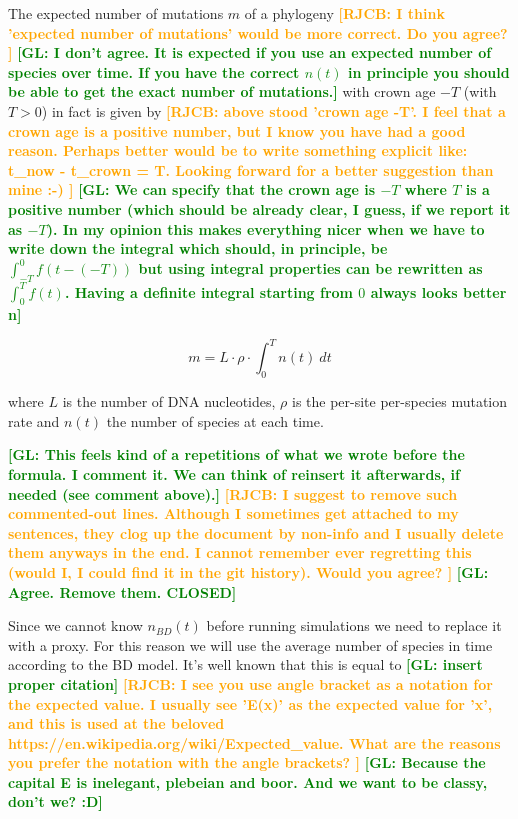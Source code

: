 \documentclass{article}
\newcommand*\richel[1]{\textcolor{orange}{\textbf{[RJCB: #1]}}}
\newcommand*\gio[1]{\textcolor{green}{\textbf{[GL: #1]}}}
\begin{document}
\begin{itemize}
The expected number of mutations $m$ of a phylogeny 
\richel{
  I think 'expected number of mutations' would be more correct.
  Do you agree?
}
\gio{I don't agree. It is expected if you use an expected number of species over time. If you have the correct $n(t)$ in principle you should be able to get the exact number of mutations.}
with crown age $-T$ (with $T>0$) in fact is given by
\richel{
  above stood 'crown age -T'. 
  I feel that a crown age is a positive number,
  but I know you have had a good reason.
  Perhaps better would be to write something explicit like:
  t\_now - t\_crown = T.
  Looking forward for a better suggestion than mine :-)
}
\gio{We can specify that the crown age is $-T$ where $T$ is a positive number (which should be already clear, I guess, if we report it as $-T$). In my opinion this makes everything nicer when we have to write down the integral which should, in principle, be $\int_{-T}^{0} f(t-(-T))$ but using integral properties can be rewritten as $\int_{0}^{T} f(t)$. Having a definite integral starting from $0$ always looks better ^^.}

\begin{equation}
m = L \cdot \rho \cdot \int_{0}^{T} n(t)\ dt \label{m calculation}
\end{equation}

where $L$ is the number of DNA nucleotides, 
$\rho$ is the per-site per-species mutation rate and
$n(t)$ the number of species at each time.

\gio{This feels kind of a repetitions of what we wrote before the formula. I comment it. We can think of reinsert it afterwards, if needed (see comment above).}
\richel{
  I suggest to remove such commented-out lines. 
  Although I sometimes get attached to my sentences,
  they clog up the document by non-info and 
  I usually delete them anyways in the end.
  I cannot remember ever regretting this (would I, 
  I could find it in the git history).
  Would you agree?
}
\gio{Agree. Remove them. CLOSED}

Since we cannot know $n_{BD}(t)$ before running simulations
we need to replace it with a proxy. 
For this reason we will use the average number of
species in time according to the BD model. 
It's well known that this is equal to \gio{insert proper citation}
\richel{
  I see you use angle bracket as a notation for the expected
  value. I usually see 'E(x)' as the expected value for 'x',
  and this is used at the beloved https://en.wikipedia.org/wiki/Expected\_value.
  What are the reasons you prefer the notation with the angle brackets?  
}
\gio{Because the capital E is inelegant, plebeian and boor. And we want to be classy, don't we? :D}


\end{itemize}
\end{document}
